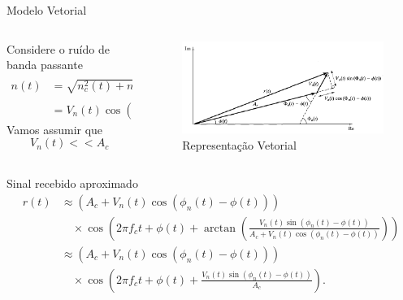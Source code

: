 \documentclass[aspectratio=169,dvipsnames]{beamer}
\begin{document}
\begin{frame}{Modelo Vetorial}
    \begin{columns}[T] %

    \begin{column}{0.5\textwidth} %
        Considere o ruído de banda passante
        \begin{align*}
        n(t) &= \sqrt{n_c^2(t) + n_s^2(t)} \cos \left( 2\pi f_c t + \arctan \left( \frac{n_s(t)}{n_c(t)} \right) \right) \\
        &= V_n(t) \cos \left( 2\pi f_c t + \phi_n(t) \right),
        \end{align*}
        Vamos assumir que
        $$
        V_n(t) << A_c
        $$
    \end{column}

    \begin{column}{0.5\textwidth} %
        \begin{figure}
            \centering
            \includegraphics[width=0.8\linewidth]{Figs//FM/analise_vetorial.png}
            \caption{Representação Vetorial}
            \label{fig:enter-label}
        \end{figure}
    \end{column}

    \end{columns}
\end{frame}

\begin{frame}{Sinal recebido aproximado}
    \begin{align*}
r(t) &\approx (A_c + V_n(t) \cos(\phi_n(t) - \phi(t))) \\
&\quad \times \cos\left(2\pi f_c t + \phi(t) + \arctan\left(\frac{V_n(t) \sin(\phi_n(t) - \phi(t))}{A_c + V_n(t) \cos(\phi_n(t) - \phi(t))}\right)\right) \\
&\approx (A_c + V_n(t) \cos(\phi_n(t) - \phi(t))) \\
&\quad \times \cos\left(2\pi f_c t + \phi(t) + \frac{V_n(t) \sin(\phi_n(t) - \phi(t))}{A_c}\right) .
\end{align*}

\end{frame}
\end{document}

